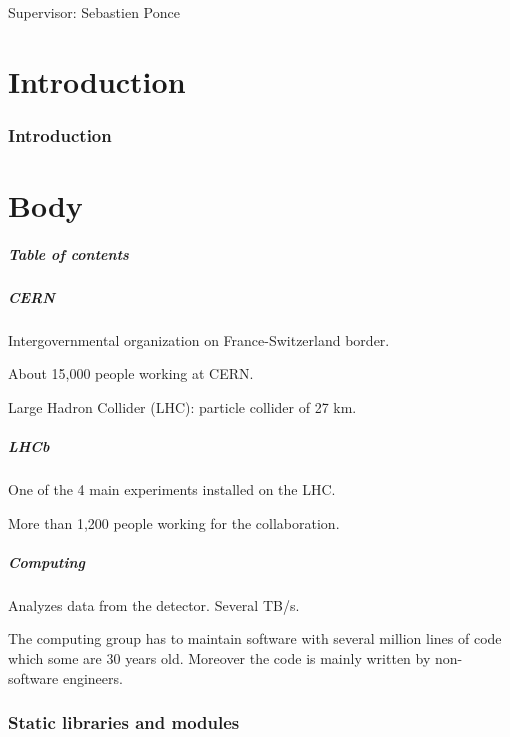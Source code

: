 \documentclass{beamer}
\begin{document}
\begin{frame}
    \maketitle

    Supervisor: Sebastien Ponce
\end{frame}

\part{Introduction}
\section*{Introduction}
\part{Body}

    \begin{frame}
        \frametitle{Table of contents}
        \tableofcontents
    \end{frame}

    \begin{frame}
        \frametitle{CERN}

        Intergovernmental organization on France-Switzerland border.

        About  15,000 people working at CERN.

        Large Hadron Collider (LHC): particle collider of 27 km.
    \end{frame}

    \begin{frame}
        \frametitle{LHCb}

        One of the 4 main experiments installed on the LHC.

        More than 1,200 people working for the collaboration.
    \end{frame}

    \begin{frame}
        \frametitle{Computing}

        Analyzes data from the detector.
        Several TB/s.

        The computing group has to maintain software with several million lines of code which some are 30 years old.
        Moreover the code is mainly written by non-software engineers.
    \end{frame}

\section{Static libraries and modules}
\end{document}
